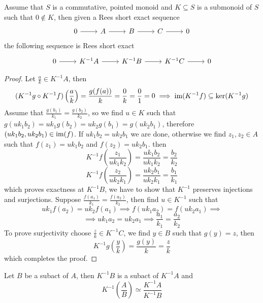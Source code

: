 \begin{proposition}
    Assume that $S$ is a commutative, pointed monoid and $K\subseteq S$ is a submonoid of $S$ such that $0\not\in K$, then
    given a Rees short exact sequence 
    \[\begin{tikzcd}
        0 & A & B & C & 0
        \arrow[from=1-1, to=1-2]
        \arrow[from=1-2, to=1-3]
        \arrow[from=1-3, to=1-4]
        \arrow[from=1-4, to=1-5]
    \end{tikzcd}\]
    the following sequence is Rees short exact
    \[\begin{tikzcd}
        0 & {K^{-1}A} & {K^{-1}B} & {K^{-1}C} & 0
        \arrow[from=1-1, to=1-2]
        \arrow[from=1-2, to=1-3]
        \arrow[from=1-3, to=1-4]
        \arrow[from=1-4, to=1-5]
    \end{tikzcd}\]
\end{proposition}
\begin{proof}[Proof]
    Let $\frac{a}{k}\in K^{-1}A$, then 
    \[
    (K^{-1}g\circ K^{-1}f)\left(\frac{a}{k}\right) = \frac{g(f(a))}{k} = \frac{0}{k} =\frac{0}{1}=0 \implies \text{im}(K^{-1}f)\subseteq\mathrm{ker}(K^{-1}g)
    \]
    Assume that $\frac{g(b_1)}{k_1}=\frac{g(b_2)}{k_2}$, so we find $u\in K$ such that 
    $g(uk_1b_2)=uk_1g(b_2)=uk_2g(b_1)=g(uk_2b_1)$, therefore 
    $(uk_1b_2,uk_2b_1)\in\text{im}(f)$. If $uk_1b_2=uk_2b_1$ we are done, otherwise 
    we find $z_1,z_2\in A$ such that $f(z_1) = uk_1b_2$ and $f(z_2)=uk_2b_1$.
    then 
    \[
        K^{-1}f\left(\frac{z_1}{uk_1k_2}\right) = \frac{uk_1b_2}{uk_1k_2} = \frac{b_2}{k_2}
    \] 
    \[
        K^{-1}f\left(\frac{z_2}{uk_2k_1}\right) = \frac{uk_2b_1}{uk_2k_1} = \frac{b_1}{k_1}
    \]
    which proves exactness at $K^{-1}B$, we have to show that $K^{-1}$ preserves injections and surjections.
    Suppose $\frac{f(a_1)}{k_1}=\frac{f(a_2)}{k_2}$, then find $u\in K^{-1}$ such that 
    \[
        uk_1f(a_2) = uk_2f(a_1)\implies f(uk_1a_2)=f(uk_2a_1) \implies
    \] 
    \[
        \implies uk_1a_2=uk_2a_1 \implies\frac{a_1}{k_1}=\frac{a_2}{k_2}
    \]
    To prove surjectivity choose $\frac{z}{k}\in K^{-1}C$, we find $y\in B$ such that $g(y)=z$, then 
    \[
        K^{-1}g\left(\frac{y}{k}\right) = \frac{g(y)}{k} = \frac{z}{k}
    \]
    which completes the proof.
\end{proof}
\begin{corollary}
    Let $B$ be a subact of $A$, then $K^{-1}B$ is a subact of $K^{-1}A$ and  
    \[
        K^{-1}\left(\frac{A}{B}\right) \simeq \frac{K^{-1}A}{K^{-1}B}
    \]
\end{corollary}
